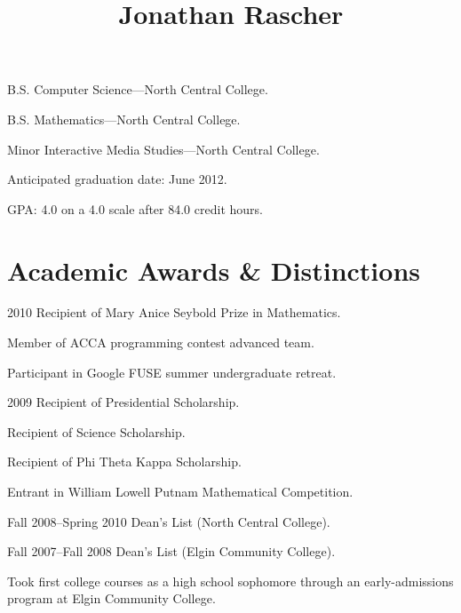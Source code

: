 \documentclass{simplecv}
\begin{document}
  \leftheader{
    \contactemail \\
    \contactphone
  }

  \rightheader{
    \contactaddressone \\
    \contactaddresstwo
  }

  \title{Jonathan Rascher}
  \maketitle

  \begin{topic}
    \item[B.S.] Computer Science---North Central College.

    \item[B.S.] Mathematics---North Central College.

    \item[Minor] Interactive Media Studies---North Central College.

    \item Anticipated graduation date: June 2012.

    \item GPA: 4.0 on a 4.0 scale after 84.0 credit hours.
  \end{topic}

  \section{Academic Awards \& Distinctions}
  \begin{topic}
    \item[2010] Recipient of Mary Anice Seybold Prize in Mathematics.

    Member of ACCA programming contest advanced team.

    Participant in Google FUSE summer undergraduate retreat.

    \item[2009] Recipient of Presidential Scholarship.

    Recipient of Science Scholarship.

    Recipient of Phi Theta Kappa Scholarship.

    Entrant in William Lowell Putnam Mathematical Competition.

    \item[Fall 2008--Spring 2010] Dean's List (North Central College).

    \item[Fall 2007--Fall 2008] Dean's List (Elgin Community College).

    \item Took first college courses as a high school sophomore through an early-admissions program at Elgin Community College.
  \end{topic}
\end{document}
